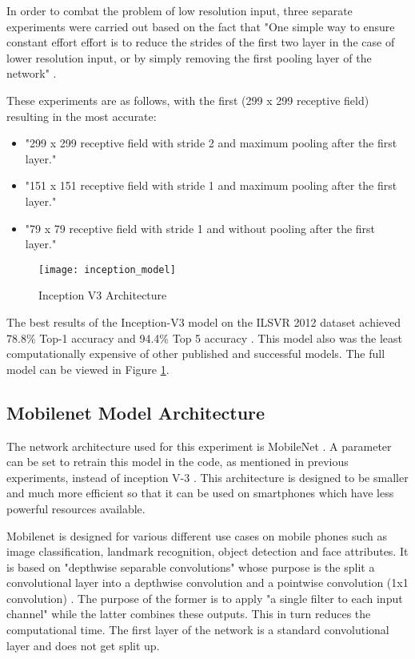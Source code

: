 In order to combat the problem of low resolution input, three separate experiments were carried out based on the fact that "One simple way to ensure constant effort effort is to reduce the strides of the first two layer in the case of lower resolution input, or by simply removing the first pooling layer of the network" \parencite{rethinkingInception}.

These experiments are as follows, with the first (299 x 299 receptive field) resulting in the most accurate:
\begin{itemize}
    \item{"299 x 299 receptive field with stride 2 and maximum pooling after the first layer." \parencite{rethinkingInception}}
    \item{"151 x 151 receptive field with stride 1 and maximum pooling after the first layer." \parencite{rethinkingInception}}
    \item{"79 x 79 receptive field with stride 1 and without pooling after the first layer." \parencite{rethinkingInception}}
\end{itemize}

\begin{figure}
     \texttt{[image: inception\_model]}
     \caption{Inception V3 Architecture \parencite{rethinkingInception}}
     \label{fig:inception_model}
\end{figure}

The best results of the Inception-V3 model on the ILSVR 2012 dataset achieved 78.8\% Top-1 accuracy and 94.4\% Top 5 accuracy \parencite{rethinkingInception}.
This model also was the least computationally expensive of other published and successful models.
The full model can be viewed in Figure \ref{fig:inception_model}.

\subsection*{Mobilenet Model Architecture}
The network architecture used for this experiment is MobileNet \parencite{mobilenet}.
A parameter can be set to retrain this model in the code, as mentioned in previous experiments, instead of inception V-3 \parencite{retrainInception}. 
This architecture is designed to be smaller and much more efficient so that
it can be used on smartphones which have less powerful resources available.

Mobilenet is designed for various different use cases on mobile phones such as image classification, landmark recognition, object detection and face attributes.
It is based on "depthwise separable convolutions" whose purpose is the split a convolutional layer into a depthwise convolution and a pointwise convolution (1x1 convolution) \parencite{mobilenet}.
The purpose of the former is to apply "a single filter to each input channel" \parencite{mobilenet} while the latter combines these outputs.
This in turn reduces the computational time.
The first layer of the network is a standard convolutional layer and does not get split up.

